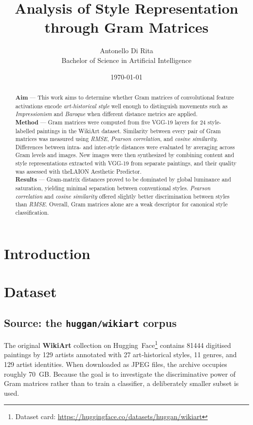 \documentclass[11pt]{article}
\title{Analysis of Style Representation through Gram Matrices}
\author{Antonello Di Rita \\ Bachelor of Science in Artificial Intelligence}
\date{\today}
\begin{document}
\maketitle

\begin{abstract}
\textbf{Aim} — This work aims to determine whether Gram matrices of convolutional feature activations encode \emph{art-historical style} well enough to distinguish movements
such as \emph{Impressionism} and \emph{Baroque} when different distance metrics are applied.\\[2pt]
\textbf{Method} — Gram matrices were computed from five VGG-19 layers for 24 style-labelled paintings in the WikiArt dataset. Similarity between every pair of Gram matrices
was measured using \emph{RMSE}, \emph{Pearson correlation}, and \emph{cosine similarity}.
Differences between intra- and inter-style distances were evaluated by averaging across Gram levels and images.
New images were then synthesized by combining content and style representations extracted with VGG-19 from separate paintings, and their quality was assessed with theLAION Aesthetic Predictor.\\[2pt]
\textbf{Results} — Gram-matrix distances proved to be dominated by global luminance and saturation, yielding minimal separation between conventional styles.
\emph{Pearson correlation} and \emph{cosine similarity} offered slightly better discrimination between styles than \emph{RMSE}.
Overall, Gram matrices alone are a weak descriptor for canonical style classification.\\[2pt]
\end{abstract}


\tableofcontents

\section{Introduction}
\section{Dataset}
\subsection{Source: the \texttt{huggan/wikiart} corpus}
The original \textbf{WikiArt} collection on Hugging~Face\footnote{Dataset card: \url{https://huggingface.co/datasets/huggan/wikiart}} contains \num{81444} digitised
paintings by \num{129} artists annotated with \num{27} art‑historical styles, \num{11} genres,
and \num{129} artist identities. When downloaded as JPEG files, the archive occupies roughly \SI{70}{GB}.
Because the goal is to investigate the discriminative power of Gram matrices rather than to train a classifier,
a deliberately smaller subset is used.
\end{document}
